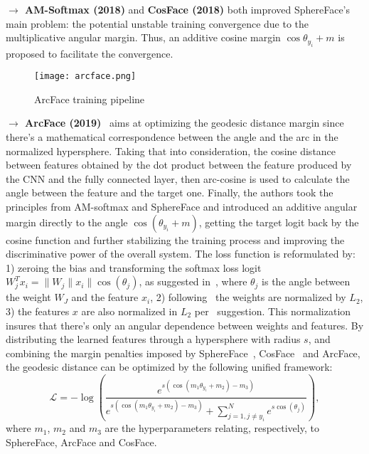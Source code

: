 \documentclass[class=report, crop=false, a4paper, 12pt]{standalone}
\begin{document}
\vspace{0.7\baselineskip}
\noindent\textbf{$\rightarrow$ AM-Softmax (2018)} and \textbf{CosFace (2018)} both improved SphereFace's main problem: the potential unstable training convergence due to the multiplicative angular margin. Thus, an additive cosine margin $\cos{\theta_{y_i}}+m$ is proposed to facilitate the convergence.

\begin{figure}[!h]
    \centering
    \texttt{[image: arcface.png]}
    \caption{ArcFace \autocite{dengArcFaceAdditiveAngular} training pipeline}
    \label{fig:sphereface}
\end{figure}

\vspace{0.7\baselineskip}
\noindent\textbf{$\rightarrow$ ArcFace (2019)}~\autocite{dengArcFaceAdditiveAngular} aims at optimizing the geodesic distance margin since there's a mathematical correspondence between the angle and the arc in the normalized hypersphere. Taking that into consideration, the cosine distance between features obtained by the dot product between the feature produced by the CNN and the fully connected layer, then arc-cosine is used to calculate the angle between the feature and the target one. Finally, the authors took the principles from AM-softmax \autocite{wangAdditiveMarginSoftmax2018} and SphereFace \autocite{liuSphereFaceDeepHypersphere2018} and introduced an additive angular margin directly to the angle $\cos{(\theta_{y_i}+m)}$, getting the target logit back by the cosine function and further stabilizing the training process and improving the discriminative power of the overall system. The loss function is reformulated by: 1) zeroing the bias and transforming the softmax loss logit $W^{T}_{j}x_i=\|W_j\|x_i\|\cos{(\theta_j)}$, as suggested in~\autocite{liuSphereFaceDeepHypersphere2018}, where $\theta_j$ is the angle between the weight $W_J$ and the feature $x_i$, 2) following~\autocite{wangNormFaceL2Hypersphere2017,liuSphereFaceDeepHypersphere2018,wangCosFaceLargeMargin2018} the weights are normalized by $L_2$, 3) the features $x$ are also normalized in $L_2$ per~\autocite{ranjanL2constrainedSoftmaxLoss2017,wangNormFaceL2Hypersphere2017,wangAdditiveMarginSoftmax2018,wangCosFaceLargeMargin2018} suggestion. This normalization insures that there's only an angular dependence between weights and features. By distributing the learned features through a hypersphere with radius $s$, and combining the margin penalties imposed by SphereFace~\autocite{liuSphereFaceDeepHypersphere2018}, CosFace~\autocite{wangCosFaceLargeMargin2018} and ArcFace, the geodesic distance can be optimized by the following unified framework:
\begin{equation}
\mathcal{L}=-\log\left(
                \frac{e^{s(\cos{(m_1\theta_{y_i}+m_2)-m_3})}}
                {e^{s(\cos{(m_1\theta_{y_i}+m_2)-m_3})} + \sum_{j=1, j\neq y_i}^{N}e^{s \cos{(\theta_j)}}}
            \right),
\end{equation}
\noindent where $m_1$, $m_2$ and $m_3$ are the hyperparameters relating, respectively, to SphereFace, ArcFace and CosFace.
\end{document}
